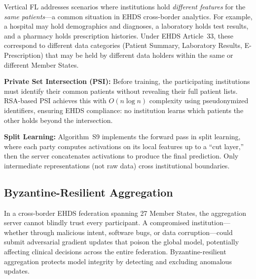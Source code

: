 \documentclass[conference,a4paper]{IEEEtran}
\begin{document}
Vertical FL addresses scenarios where institutions hold \textit{different features} for the \textit{same patients}---a common situation in EHDS cross-border analytics. For example, a hospital may hold demographics and diagnoses, a laboratory holds test results, and a pharmacy holds prescription histories. Under EHDS Article~33, these correspond to different data categories (Patient Summary, Laboratory Results, E-Prescription) that may be held by different data holders within the same or different Member States.

\textbf{Private Set Intersection (PSI):} Before training, the participating institutions must identify their common patients without revealing their full patient lists. RSA-based PSI achieves this with $O(n \log n)$ complexity using pseudonymized identifiers, ensuring EHDS compliance: no institution learns which patients the other holds beyond the intersection.

\textbf{Split Learning:} Algorithm~S9 implements the forward pass in split learning, where each party computes activations on its local features up to a ``cut layer,'' then the server concatenates activations to produce the final prediction. Only intermediate representations (not raw data) cross institutional boundaries.

\begin{figure}[htbp]
\centering
{}
\end{figure}

\subsection{Byzantine-Resilient Aggregation}

In a cross-border EHDS federation spanning 27 Member States, the aggregation server cannot blindly trust every participant. A compromised institution---whether through malicious intent, software bugs, or data corruption---could submit adversarial gradient updates that poison the global model, potentially affecting clinical decisions across the entire federation. Byzantine-resilient aggregation protects model integrity by detecting and excluding anomalous updates.
\end{document}
